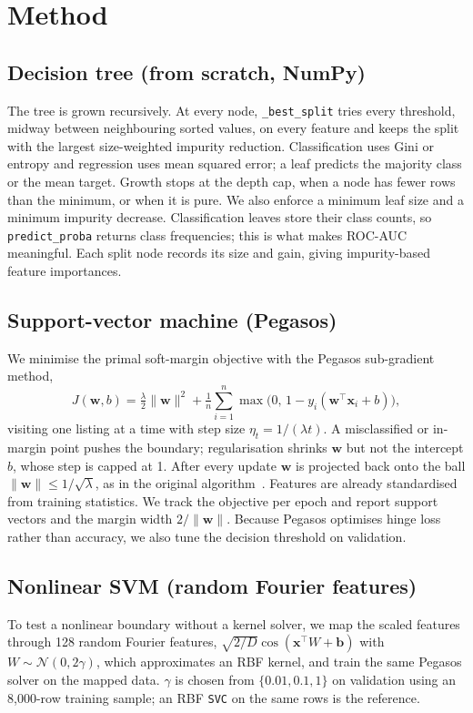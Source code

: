 \section{Method}
\subsection{Decision tree (from scratch, NumPy)}
The tree is grown recursively. At every node, \texttt{\_best\_split} tries every threshold, midway between neighbouring sorted values, on every feature and keeps the split with the largest size-weighted impurity reduction. Classification uses Gini or entropy and regression uses mean squared error; a leaf predicts the majority class or the mean target. Growth stops at the depth cap, when a node has fewer rows than the minimum, or when it is pure. We also enforce a minimum leaf size and a minimum impurity decrease. Classification leaves store their class counts, so \texttt{predict\_proba} returns class frequencies; this is what makes ROC-AUC meaningful. Each split node records its size and gain, giving impurity-based feature importances.

\subsection{Support-vector machine (Pegasos)}
We minimise the primal soft-margin objective with the Pegasos sub-gradient method,
\begin{equation}
  J(\mathbf{w},b)=\tfrac{\lambda}{2}\lVert\mathbf{w}\rVert^{2}
  +\tfrac{1}{n}\sum_{i=1}^{n}\max\!\big(0,\,1-y_i(\mathbf{w}^{\top}\mathbf{x}_i+b)\big),
\end{equation}
visiting one listing at a time with step size $\eta_t=1/(\lambda t)$. A misclassified or in-margin point pushes the boundary; regularisation shrinks $\mathbf{w}$ but not the intercept $b$, whose step is capped at 1. After every update $\mathbf{w}$ is projected back onto the ball $\lVert\mathbf{w}\rVert\le 1/\sqrt{\lambda}$, as in the original algorithm~\cite{pegasos}. Features are already standardised from training statistics. We track the objective per epoch and report support vectors and the margin width $2/\lVert\mathbf{w}\rVert$. Because Pegasos optimises hinge loss rather than accuracy, we also tune the decision threshold on validation.

\subsection{Nonlinear SVM (random Fourier features)}
To test a nonlinear boundary without a kernel solver, we map the scaled features through 128 random Fourier features, $\sqrt{2/D}\cos(\mathbf{x}^{\top}W+\mathbf{b})$ with $W\sim\mathcal{N}(0,2\gamma)$, which approximates an RBF kernel, and train the same Pegasos solver on the mapped data. $\gamma$ is chosen from $\{0.01,0.1,1\}$ on validation using an 8{,}000-row training sample; an RBF \texttt{SVC} on the same rows is the reference.

